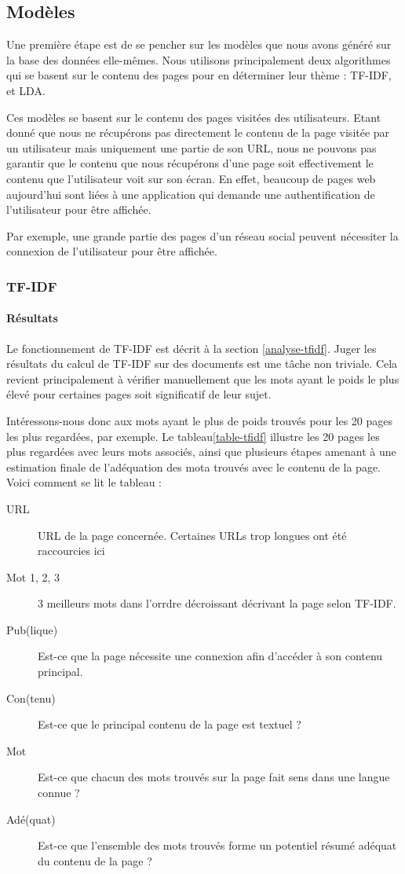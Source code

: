 	\subsection{Modèles}

		Une première étape est de se pencher sur les modèles que nous avons généré sur la base des données elle-mêmes. Nous utilisons principalement deux algorithmes qui se basent sur le contenu des pages pour en déterminer leur thème : TF-IDF, et LDA.

		Ces modèles se basent sur le contenu des pages visitées des utilisateurs. Etant donné que nous ne récupérons pas directement le contenu de la page visitée par un utilisateur mais uniquement une partie de son URL, nous ne pouvons pas garantir que le contenu que nous récupérons d'une page soit effectivement le contenu que l'utilisateur voit sur son écran. En effet, beaucoup de pages web aujourd'hui sont liées à une application qui demande une authentification de l'utilisateur pour être affichée.

		Par exemple, une grande partie des pages d'un réseau social peuvent nécessiter la connexion de l'utilisateur pour être affichée.

		\subsubsection{TF-IDF}

			\paragraph{Résultats}

				Le fonctionnement de TF-IDF est décrit à la section \ref{analyse-tfidf}. Juger les résultats du calcul de TF-IDF sur des documents est une tâche non triviale. Cela revient principalement à vérifier manuellement que les mots ayant le poids le plus élevé pour certaines pages soit significatif de leur sujet.

				Intéressons-nous donc aux mots ayant le plus de poids trouvés pour les 20 pages les plus regardées, par exemple. Le tableau\ref{table-tfidf} illustre les 20 pages les plus regardées avec leurs mots associés, ainsi que plusieurs étapes amenant à une estimation finale de l'adéquation des mota trouvés avec le contenu de la page. Voici comment se lit le tableau :
				\begin{description}
					\item[URL] URL de la page concernée. Certaines URLs trop longues ont été raccourcies ici
					\item[Mot 1, 2, 3] 3 meilleurs mots dans l'orrdre décroissant décrivant la page selon TF-IDF.
					\item[Pub(lique)] Est-ce que la page nécessite une connexion afin d'accéder à son contenu principal.
					\item[Con(tenu)] Est-ce que le principal contenu de la page est textuel ?
					\item[Mot] Est-ce que chacun des mots trouvés sur la page fait sens dans une langue connue ?
					\item[Adé(quat)] Est-ce que l'ensemble des mots trouvés forme un potentiel résumé adéquat du contenu de la page ?
				\end{description}

